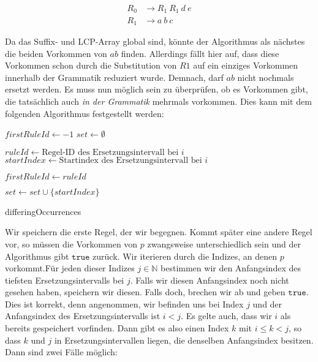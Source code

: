 \begin{align*}
	R_0 &\rightarrow R_1\ R_1\ d\ e\\
	R_1 &\rightarrow a\ b\ c
\end{align*}

Da das Suffix- und LCP-Array global sind, könnte der Algorithmus als nächstes die beiden Vorkommen von $ab$ finden. 
Allerdings fällt hier auf, dass diese Vorkommen schon durch die Substitution von $R1$ auf ein einziges Vorkommen innerhalb der Grammatik reduziert wurde. Demnach, darf $ab$ nicht nochmals ersetzt werden. 
Es muss nun möglich sein zu überprüfen, ob es Vorkommen gibt, die tatsächlich auch \emph{in der Grammatik} mehrmals vorkommen.
Dies kann mit dem folgenden Algorithmus festgestellt werden:

\begin{algorithm}
    $firstRuleId \leftarrow -1$\;
    $set \leftarrow \emptyset$\;
     {
        $ruleId \leftarrow \text{Regel-ID des Ersetzungsintervall bei } i$\;
        $startIndex \leftarrow \text{Startindex des Ersetzungsintervall bei } i$\;
        
         {
            $firstRuleId \leftarrow ruleId$\;
        }
         {
            \;
        }
            
        $set \leftarrow set \cup \{startIndex\}$\;
    }
    \;
    \caption{differingOccurrences}
\end{algorithm}

Wir speichern die erste Regel, der wir begegnen. Kommt später eine andere Regel vor, so müssen die Vorkommen von $p$ zwangsweise unterschiedlich sein und der Algorithmus gibt $\texttt{true}$ zurück.
Wir iterieren durch die Indizes, an denen $p$ vorkommt.Für jeden dieser Indizes $j \in \mathbb{N}$ bestimmen wir den Anfangsindex des tiefsten Ersetzungsintervalls bei $j$. 
Falls wir diesen Anfangsindex noch nicht gesehen haben, speichern wir diesen. Falls doch, brechen wir ab und geben $\texttt{true}$. 
Dies ist korrekt, denn angenommen, wir befinden uns bei Index $j$ und der Anfangsindex des Ersetzungsintervalls ist $i < j$. Es gelte auch, dass wir $i$ als bereits gespeichert vorfinden. Dann gibt es also einen Index $k$ mit $i \leq k < j$, so dass $k$ und $j$ in Ersetzungsintervallen liegen, die denselben Anfangsindex besitzen. Dann sind zwei Fälle möglich:

